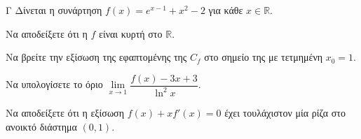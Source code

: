 \begin{thema}{Γ}
Δίνεται η συνάρτηση $f(x) = e^{x-1} + x^2 - 2$ για κάθε $x \in \mathbb{R}$.
\begin{erwthma}
  \item Να αποδείξετε ότι η $f$ είναι κυρτή στο $\mathbb{R}$.
  \item Να βρείτε την εξίσωση της εφαπτομένης της $C_f$ στο σημείο της με τετμημένη $x_0 = 1$.
  \item Να υπολογίσετε το όριο $\lim\limits_{x \to 1} \dfrac{f(x) - 3x + 3}{\ln^2 x}$.
  \item Να αποδείξετε ότι η εξίσωση $f(x) + x f'(x) = 0$ έχει τουλάχιστον μία ρίζα στο ανοικτό διάστημα $(0, 1)$.
\end{erwthma}
\end{thema}

